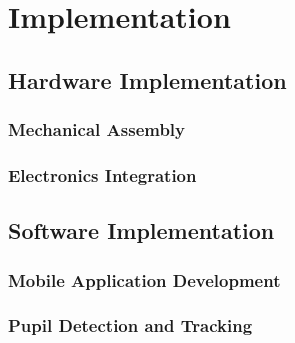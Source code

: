 \chapter{Implementation}
\label{chapter:implementation}




\section{Hardware Implementation}


\subsection{Mechanical Assembly}



\subsection{Electronics Integration}



\section{Software Implementation}


\subsection{Mobile Application Development}



\subsection{Pupil Detection and Tracking}

